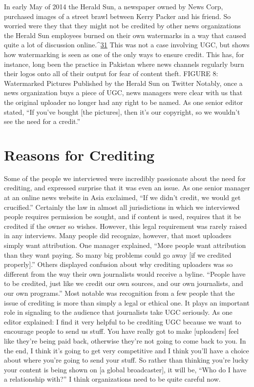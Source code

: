 \begin{enumerate}
In early May of 2014 the Herald Sun, a newspaper owned by News Corp,
purchased images of a street brawl between Kerry Packer and his friend. So
worried were they that they might not be credited by other news organizations
the Herald Sun employees burned on their own watermarks in a way
that caused quite a lot of discussion online.^{\href{#endnotes}{31}} This was not a case involving
UGC, but shows how watermarking is seen as one of the only ways
to ensure credit. This has, for instance, long been the practice in Pakistan
where news channels regularly burn their logos onto all of their output for
fear of content theft.
FIGURE 8: Watermarked Pictures Published by the Herald Sun on Twitter
Notably, once a news organization buys a piece of UGC, news managers
were clear with us that the original uploader no longer had any right to be
named. As one senior editor stated, ``If you've bought [the pictures], then it's
our copyright, so we wouldn't see the need for a credit.''

\section{Reasons for Crediting}
Some of the people we interviewed were incredibly passionate about the
need for crediting, and expressed surprise that it was even an issue. As one
senior manager at an online news website in Asia exclaimed, ``If we didn't
credit, we would get crucified.''
Certainly the law in almost all jurisdictions in which we interviewed people
requires permission be sought, and if content is used, requires that it be
credited if the owner so wishes. However, this legal requirement was rarely
raised in any interviews. Many people did recognize, however, that most
uploaders simply want attribution. One manager explained, ``More people
want attribution than they want paying. So many big problems could go
away [if we credited properly].''
Others displayed confusion about why crediting uploaders was so different
from the way their own journalists would receive a byline. ``People have to
be credited, just like we credit our own sources, and our own journalists,
and our own programs.''
Most notable was recognition from a few people that the issue of crediting
is more than simply a legal or ethical one. It plays an important role in
signaling to the audience that journalists take UGC seriously. As one editor
explained:
I find it very helpful to be crediting UGC because we want to encourage
people to send us stuff. You have really got to make [uploaders]
feel like they're being paid back, otherwise they're not going to come
back to you. In the end, I think it's going to get very competitive and I
think you'll have a choice about where you're going to send your stuff.
So rather than thinking you're lucky your content is being shown on
[a global broadcaster], it will be, ``Who do I have a relationship with?''
I think organizations need to be quite careful now.


\end{enumerate}
